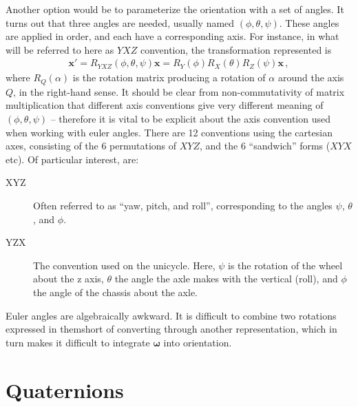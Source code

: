 \documentclass[main.tex]{subfiles}
\begin{document}
Another option would be to parameterize the orientation with a set of angles.
It turns out that three angles are needed, usually named $(\phi, \theta, \psi)$.
These angles are applied in order, and each have a corresponding axis. For instance, in what will be referred to here as $YXZ$ convention\footnotemark, the transformation represented is
\begin{align}
	\bm{x}' = R_{YXZ}(\phi, \theta, \psi)\bm{x} = R_Y(\phi)R_X(\theta)R_Z(\psi) \bm{x}\,,
	\label{eq:euler-matrix}
\end{align}
where $R_Q(\alpha)$ is the rotation matrix producing a rotation of $\alpha$ around the axis $Q$, in the right-hand sense. It should be clear from non-commutativity of matrix multiplication that different axis conventions give very different meaning of $(\phi, \theta, \psi)$ -- therefore it is vital to be explicit about the axis convention used when working with euler angles. There are 12 conventions using the cartesian axes, consisting of the 6 permutations of $XYZ$, and the 6 \enquote{sandwich} forms ($XYX$ etc). Of particular interest, are:
\begin{description}
	\item[XYZ]
		Often referred to as \enquote{yaw, pitch, and roll}\footnotemark, corresponding to the angles $\psi$, $\theta$, and $\phi$.
	\item[YZX]
		The convention used on the unicycle. Here, $\psi$ is the rotation of the wheel about the z axis, $\theta$ the angle the axle makes with the vertical (roll), and $\phi$ the angle of the chassis about the axle.
\end{description}
Euler angles are algebraically awkward. It is difficult to combine two rotations expressed in them\footnotemark short of converting through another representation, which in turn makes it difficult to integrate $\bm{\omega}$ into orientation.



\section{Quaternions}
\end{document}

